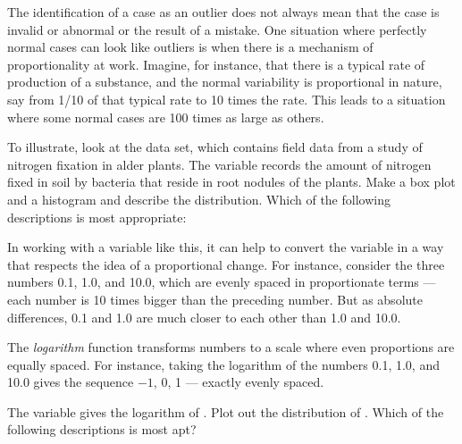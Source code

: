 
The identification of a case as an outlier does not always mean that
the case is invalid or abnormal or the result of a mistake.  One
situation where perfectly normal cases can look like outliers is when
there is a mechanism of proportionality at work.  Imagine, for
instance, that there is a typical rate of production of a substance,
and the normal variability is proportional in nature, say from 1/10 of
that typical rate to 10 times the rate.  This leads to a situation
where some normal cases are 100 times as large as others.

To illustrate, look at the  data set, which contains
field data from a study of nitrogen fixation in alder plants.  The
 variable records the amount of nitrogen fixed in soil by
bacteria that reside in root nodules of the plants.  Make a box plot
and a histogram and describe the distribution.  Which of the following
descriptions is most appropriate:

\begin{MultipleChoice}
\end{MultipleChoice}

In working with a variable like this, it can help to convert the
variable in a way that respects the idea of a proportional change. 
For instance, consider the three numbers 0.1, 1.0, and 10.0, which are
evenly spaced in proportionate terms --- each number is 10 times
bigger than the preceding number.  But as absolute differences, 0.1
and 1.0 are much closer to each other than 1.0 and 10.0.

The {\em logarithm} function transforms numbers to a scale where even
proportions are equally spaced.  For instance, taking the logarithm of the
numbers 0.1, 1.0, and 10.0 gives the sequence $-1$, 0, 1 --- exactly
evenly spaced.  

The  variable gives the logarithm of .  Plot out
the distribution of .  Which of the following descriptions
is most apt?
\begin{MultipleChoice}
\end{MultipleChoice}

